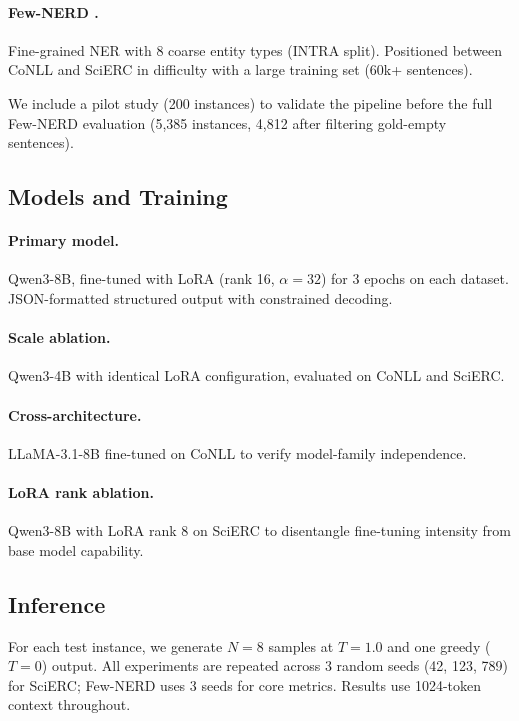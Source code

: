 \documentclass[11pt,twocolumn]{article}
\begin{document}
\paragraph{Few-NERD \citep{ding2021fewnerd}.} Fine-grained NER with 8 coarse entity types (INTRA split).
Positioned between CoNLL and SciERC in difficulty with a large training set (60k+ sentences).

We include a pilot study (200 instances) to validate the pipeline before the full Few-NERD evaluation (5,385 instances, 4,812 after filtering gold-empty sentences).

\subsection{Models and Training}

\paragraph{Primary model.} Qwen3-8B, fine-tuned with LoRA (rank 16, $\alpha{=}32$) for 3 epochs on each dataset.
JSON-formatted structured output with constrained decoding.

\paragraph{Scale ablation.} Qwen3-4B with identical LoRA configuration, evaluated on CoNLL and SciERC.

\paragraph{Cross-architecture.} LLaMA-3.1-8B fine-tuned on CoNLL to verify model-family independence.

\paragraph{LoRA rank ablation.} Qwen3-8B with LoRA rank 8 on SciERC to disentangle fine-tuning intensity from base model capability.

\subsection{Inference}

For each test instance, we generate $N{=}8$ samples at $T{=}1.0$ and one greedy ($T{=}0$) output.
All experiments are repeated across 3 random seeds (42, 123, 789) for SciERC; Few-NERD uses 3 seeds for core metrics.
Results use 1024-token context throughout.
\end{document}
